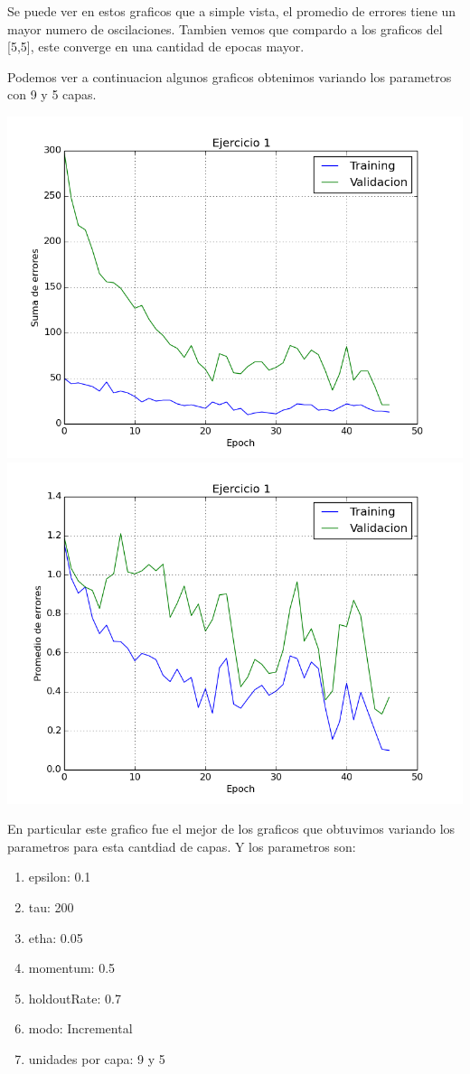 Se puede ver en estos graficos que a simple vista, el promedio de errores tiene un mayor numero de oscilaciones. Tambien vemos que compardo a los graficos del [5,5], este converge en una cantidad de epocas mayor.

Podemos ver a continuacion algunos graficos obtenimos variando los parametros con 9 y 5 capas.


\includegraphics[scale=0.4]{img/ej100505195sum}
\includegraphics[scale=0.4]{img/ej100505195mean}


En particular este grafico fue el mejor de los graficos que obtuvimos variando los parametros para esta cantdiad de capas. Y los parametros son:
\begin{enumerate}
\item epsilon: 0.1
\item tau: 200
\item etha: 0.05
\item momentum: 0.5
\item holdoutRate: 0.7
\item modo: Incremental
\item unidades por capa: 9 y 5
\end{enumerate}

